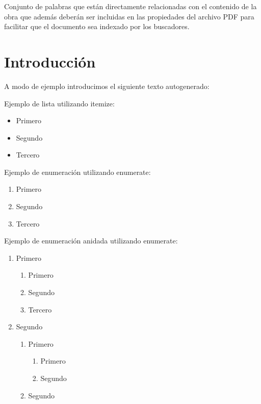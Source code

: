 \documentclass[12pt,a4paper,oneside]{book}
\begin{document}
\vspace{1cm}

Conjunto de palabras que están directamente relacionadas con el contenido de la obra que además deberán ser incluidas en las
propiedades del archivo PDF para facilitar que el documento sea indexado por los buscadores.





\tableofcontents

\chapter{Introducción} 
\label{intro} %

A modo de ejemplo introducimos el siguiente texto autogenerado:



Ejemplo de lista utilizando itemize:
\begin{itemize}
    \item Primero
    \item Segundo
    \item Tercero\\
\end{itemize}

Ejemplo de enumeración utilizando enumerate:
\begin{enumerate}
    \item Primero
    \item Segundo
    \item Tercero\\
\end{enumerate}

Ejemplo de enumeración anidada utilizando enumerate:
\begin{enumerate}
    \item Primero 
        \begin{enumerate}
        \item Primero
        \item Segundo
        \item Tercero
        \end{enumerate}
    \item Segundo
        \begin{enumerate}
        \item Primero
            \begin{enumerate}
            \item Primero
            \item Segundo
            \end{enumerate}
        \item Segundo
        \end{enumerate}
\end{enumerate}
\end{document}
